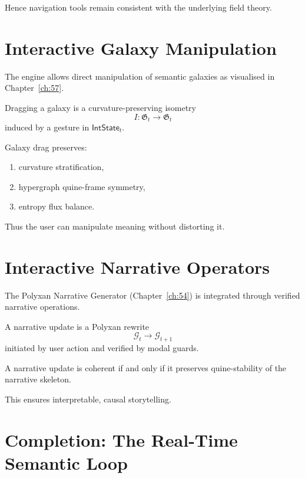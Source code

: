 Hence navigation tools remain consistent with the underlying field theory.

\section{Interactive Galaxy Manipulation}
\label{sec:58:manip}

The engine allows direct manipulation of semantic galaxies as visualised in
Chapter~\ref{ch:57}.

\begin{definition}
Dragging a galaxy is a curvature-preserving isometry
\[
I : \mathfrak{G}_t \to \mathfrak{G}_t
\]
induced by a gesture in $\mathsf{IntState}_t$.
\end{definition}

\begin{theorem}
Galaxy drag preserves:
\begin{enumerate}
  \item curvature stratification,
  \item hypergraph quine-frame symmetry,
  \item entropy flux balance.
\end{enumerate}
\end{theorem}

Thus the user can manipulate meaning without distorting it.

\section{Interactive Narrative Operators}
\label{sec:58:narrative}

The Polyxan Narrative Generator (Chapter~\ref{ch:54}) is integrated through 
verified narrative operations.

\begin{definition}
A narrative update is a Polyxan rewrite
\[
\mathcal{G}_t \to \mathcal{G}_{t+1}
\]
initiated by user action and verified by modal guards.
\end{definition}

\begin{theorem}
A narrative update is coherent if and only if it preserves quine-stability of 
the narrative skeleton.
\end{theorem}

This ensures interpretable, causal storytelling.

\section{Completion: The Real-Time Semantic Loop}
\label{sec:58:loop}

